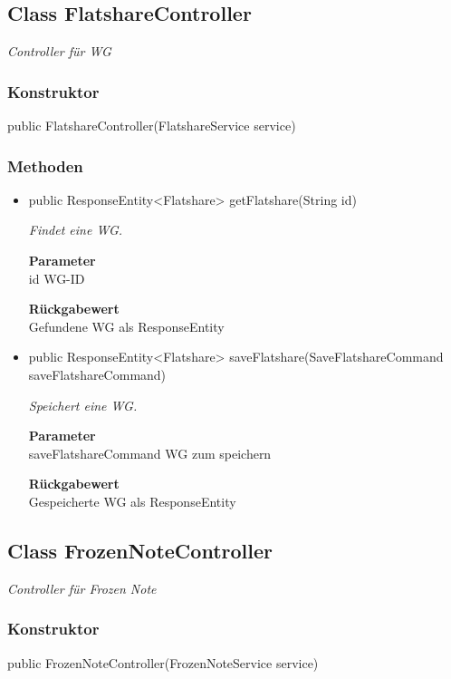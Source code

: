 \documentclass[a4paper]{scrreprt}
\begin{document}
        \subsection{Class FlatshareController}
        \textit{Controller für WG}
        \subsubsection{Konstruktor}
        public FlatshareController(FlatshareService service)
        \subsubsection{Methoden}
        \begin{itemize}
        	\item{public ResponseEntity<Flatshare> getFlatshare(String id)}
        	
        	\textit{Findet eine WG.}
        	
        	\textbf{Parameter} \\
        	id WG-ID
        	
        	\textbf{Rückgabewert} \\
        	Gefundene WG als ResponseEntity        \item{public ResponseEntity<Flatshare> saveFlatshare(SaveFlatshareCommand saveFlatshareCommand)}
        	
        	\textit{Speichert eine WG.}
        	
        	\textbf{Parameter} \\
        	saveFlatshareCommand WG zum speichern
        	
        	\textbf{Rückgabewert} \\
        	Gespeicherte WG als ResponseEntity
        \end{itemize}
        \subsection{Class FrozenNoteController}
        \textit{Controller für Frozen Note}
        \subsubsection{Konstruktor}
        public FrozenNoteController(FrozenNoteService service)
\end{document}
